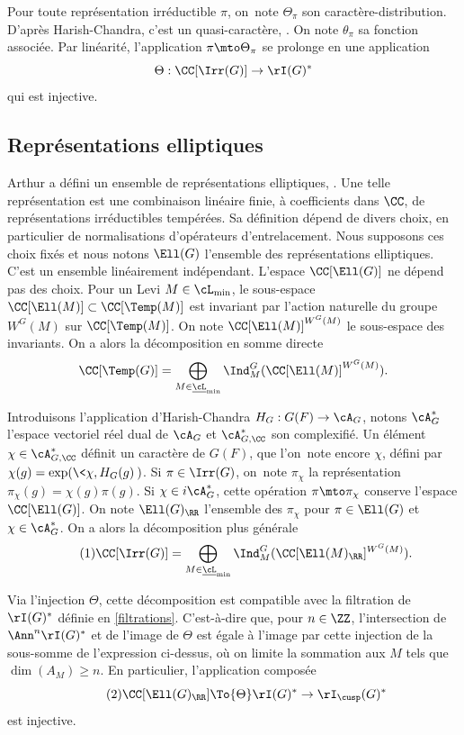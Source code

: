 Pour toute représentation irréductible $\pi$, on~note $\Theta_{\pi}$
son caractère-distribution. D'après Harish-Chandra, c'est un quasi-caractère, \cf \cite[Th.\,16.2]{HC}. On note $\theta_{\pi}$ sa fonction associée. Par linéarité, l'application $\pi\mto \Theta_{\pi}$ se prolonge en une application
\[
\Theta:\CC[\Irr(G)]\to \rI(G)^*
\]
qui est injective.

\subsection{Représentations elliptiques}\label{representationselliptiques}
Arthur a défini un ensemble de \og représentations elliptiques\fg, \cf \cite[\S3]{A2}. Une telle représentation est une combinaison linéaire finie, à coefficients dans $\CC$, de représentations irréductibles tempérées. Sa définition dépend de divers choix, en particulier de normalisations d'opérateurs d'entrelacement. Nous supposons ces choix fixés et nous notons $\Ell(G)$ l'ensemble des représentations ellip\-ti\-ques. C'est un ensemble linéairement indépendant. L'espace $\CC[\Ell(G)]$ ne dépend pas des choix. Pour un Levi $M\in \cL_{\min}$, le sous-espace $\CC[\Ell(M)]\subset \CC[\Temp(M)]$ est invariant par l'action naturelle du groupe $ W^G(M)$ sur $\CC[\Temp(M)]$. On note $\CC[\Ell(M)]^{W^G(M)}$ le sous-espace des invariants. On a alors la décomposition en somme directe
\[
\CC[\Temp(G)]=\bigoplus_{M\in\underline{\cL}_{\min}}\Ind_{M}^G(\CC[\Ell(M)]^{W^G(M)}).
\]

Introduisons l'application d'Harish-Chandra $H_{G}:G(F)\to \cA_{G}$, notons $\cA_{G}^*$ l'espace vectoriel réel dual de $\cA_{G}$ et $\cA_{G,\CC}^*$ son complexifié. Un élément $\chi\in \cA_{G,\CC}^*$ définit un caractère de $G(F)$, que l'on~note encore $\chi$, défini par $\chi(g)=\exp(\<\chi,H_{G}(g)\>)$. Si $\pi\in \Irr(G)$, on~note $\pi_{\chi}$ la représentation $\pi_{\chi}(g)=\chi(g)\pi(g)$. Si $\chi\in i\cA_{G}^*$, cette opération $\pi\mto \pi_{\chi}$ conserve l'espace $\CC[\Ell(G)]$. On note $\Ell(G)_{\RR}$ l'ensemble des $\pi_{\chi}$ pour $\pi\in \Ell(G)$ et $\chi\in \cA_{G}^*$. On a alors la décomposition plus générale
\begin{equation}\tag{1}\label{representationselliptiques1}
\CC[\Irr(G)]=\bigoplus_{M\in\underline{\cL}_{\min}}\Ind_{M}^G(\CC[\Ell(M)_{\RR}]^{W^G(M)}).
\end{equation}

Via l'injection $\Theta$, cette décomposition est compatible avec la filtration de $\rI(G)^*$ définie en \ref{filtrations}. C'est-à-dire que, pour $n\in \ZZ$, l'intersection de $\Ann^n\rI(G)^*$ et de l'image de $\Theta$ est égale à l'image par cette injection de la sous-somme de l'expression ci-dessus, où on limite la sommation aux $M$ tels que $\dim(A_{M})\geq n$. En particulier, l'application composée
\begin{equation}\tag{2}\label{representationselliptiques2}
\CC[\Ell(G)_{\RR}]\To{\Theta}\rI(G)^*\to \rI_{\cusp}(G)^*
\end{equation}
est injective.


